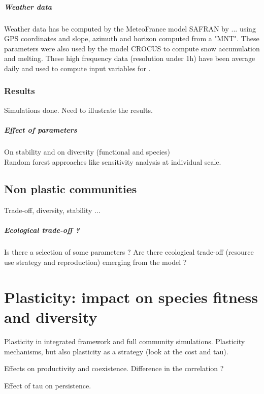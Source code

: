 \paragraph{Weather data}
Weather data has be computed by the MeteoFrance model SAFRAN by ... using GPS coordinates and slope, azimuth and horizon computed from a "MNT". These parameters were also used by the model CROCUS to compute snow accumulation and melting. These high frequency data (resolution under 1h) have been average daily and used to compute input variables for \model.

\subsection{Results}

Simulations done. Need to illustrate the results.\\

\paragraph{Effect of parameters}
On stability and on diversity (functional and species)\\
Random forest approaches like sensitivity analysis at individual scale.


\section{Non plastic communities}
Trade-off, diversity, stability ...


\paragraph{Ecological trade-off ?}
Is there a selection of some parameters ? Are there ecological trade-off (resource use strategy and reproduction) emerging from the model ?

\chapter{Plasticity: impact on species fitness and diversity}

Plasticity in integrated framework and full community simulations. Plasticity mechanisms, but also plasticity as a strategy (look at the cost and tau). 

Effects on productivity and coexistence. Difference in the correlation ?

Effect of tau on persistence.

